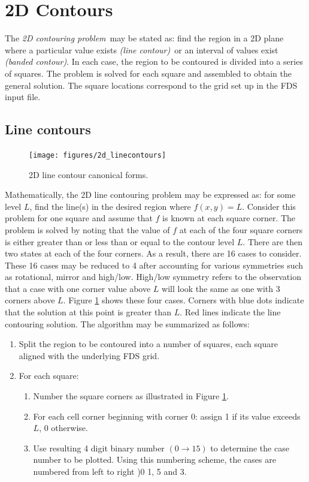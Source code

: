 \documentclass[11pt,twoside]{book}
\newcommand{\figoptions}{htp}
\begin{document}
\section{2D Contours}


The {\em 2D contouring problem}\ may be stated as: find the region in a 2D plane where a particular value exists {\em (line contour)}\ or an interval of values exist {\em (banded contour)}.   In each case, the  region to be contoured is divided into a series of squares.  The problem is solved for each square and assembled to obtain the general solution.  The square locations correspond to the grid set up in the FDS input file.

\subsection{Line contours}
\begin{figure}[\figoptions]
\begin{center}
\texttt{[image: figures/2d\_linecontours]}
\end{center}
\caption{2D line contour canonical forms.
  }
\label{fig2dline}%
\end{figure}
Mathematically, the 2D line contouring problem may be expressed as: for some level $L$, find the line(s) in the desired region where $f(x,y)=L$.  Consider this problem for one square and assume that $f$ is known at each square corner.  The problem is solved by noting that the value of $f$ at each of the four square corners is either greater than or less than or equal to the contour level $L$.  There are then two states at each of the four corners.  As a result, there are 16 cases to consider.  These 16 cases may be reduced to 4 after accounting for various symmetries such as rotational, mirror and high/low.  High/low symmetry refers to the observation that a case with one corner value above $L$ will look the same as one with 3 corners above $L$.
Figure \ref{fig2dline} shows these four cases.  Corners with blue dots indicate that the solution at this point is greater than $L$.  Red lines indicate the line contouring solution.  The algorithm may be summarized as follows:
\begin{enumerate}
\item Split the region to be contoured into a number of squares, each square aligned with the underlying FDS grid.
\item For  each square:
\begin{enumerate}
\item Number the square corners as illustrated in Figure \ref{fig2dline}.
\item For each cell corner beginning with corner 0: assign 1 if its value exceeds $L$, 0 otherwise.
\item Use resulting 4 digit binary number $(0\rightarrow 15)$ to determine the case number to be plotted.  Using this numbering scheme, the cases are numbered from left to right )0 1, 5 and 3.
\end{enumerate}
\end{enumerate}
\end{document}
